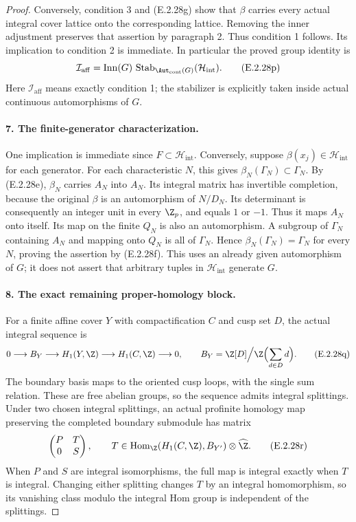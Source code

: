 \begin{proof}
Conversely, condition 3 and (E.2.28g) show that \(\beta\)
carries every actual integral cover lattice onto the
corresponding lattice. Removing the inner adjustment
preserves that assertion by paragraph 2. Thus condition 1
follows. Its implication to condition 2 is immediate.
In particular the proved group identity is
\[
 \mathcal I_{\mathrm{aff}}
   =\operatorname{Inn}(G)\,
       \operatorname{Stab}_{\Aut_{\mathrm{cont}}(G)}
                    (\mathcal H_{\mathrm{int}}).
 \tag{E.2.28p}
\]
Here \(\mathcal I_{\mathrm{aff}}\) means exactly condition 1;
the stabilizer is explicitly taken inside actual continuous
automorphisms of \(G\).

\paragraph{7. The finite-generator characterization.}
One implication is immediate since \(F\subset
\mathcal H_{\mathrm{int}}\). Conversely, suppose
\(\beta(x_j)\in\mathcal H_{\mathrm{int}}\) for each
generator. For each characteristic \(N\), this gives
\(\beta_N(\Gamma_N)\subset\Gamma_N\). By (E.2.28e),
\(\beta_N\) carries \(A_N\) into \(A_N\). Its integral
matrix has invertible completion, because the original
\(\beta\) is an automorphism of \(N/D_N\). Its determinant
is consequently an integer unit in every \(\Z_p\), and
equals \(1\) or \(-1\). Thus it maps \(A_N\) onto itself.
Its map on the finite \(Q_N\) is also an automorphism.
A subgroup of \(\Gamma_N\) containing \(A_N\) and mapping
onto \(Q_N\) is all of \(\Gamma_N\). Hence
\(\beta_N(\Gamma_N)=\Gamma_N\) for every \(N\), proving
the assertion by (E.2.28f).
This uses an already given automorphism of \(G\); it does
not assert that arbitrary tuples in
\(\mathcal H_{\mathrm{int}}\) generate \(G\).

\paragraph{8. The exact remaining proper-homology block.}
For a finite affine cover \(Y\) with compactification \(C\)
and cusp set \(D\), the actual integral sequence is
\[
 0\longrightarrow B_Y\longrightarrow H_1(Y,\Z)
     \longrightarrow H_1(C,\Z)\longrightarrow0,\qquad
 B_Y=\Z[D]\Big/\Z\Bigl(\sum_{d\in D}d\Bigr).
 \tag{E.2.28q}
\]
The boundary basis maps to the oriented cusp loops, with
the single sum relation. These are free abelian groups,
so the sequence admits integral splittings. Under two
chosen integral splittings, an actual profinite homology
map preserving the completed boundary submodule has matrix
\[
 \begin{pmatrix}P&T\\0&S\end{pmatrix},\qquad
 T\in\operatorname{Hom}_{\Z}(H_1(C,\Z),B_{Y'})
                          \otimes\widehat\Z.
 \tag{E.2.28r}
\]
When \(P\) and \(S\) are integral isomorphisms, the full
map is integral exactly when \(T\) is integral. Changing
either splitting changes \(T\) by an integral homomorphism,
so its vanishing class modulo the integral Hom group
is independent of the splittings.


\end{proof}
